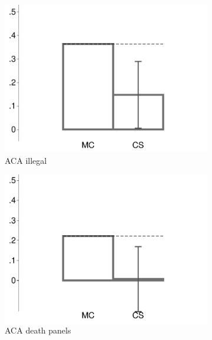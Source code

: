 \begin{figure}[t]
\begin{subfigure}{.325\textwidth}
		\includegraphics[width=\textwidth]{../figs/confidence_score_illegal_study1.pdf}
		\caption{ACA illegal}
	\end{subfigure}	
	\begin{subfigure}{.325\textwidth}\centering
		\includegraphics[width=\textwidth]{../figs/confidence_score_death_study1.pdf}
		\caption{ACA death panels}
	\end{subfigure}
	\hfill
	\begin{subfigure}{.325\textwidth}\centering

\end{subfigure}
\end{figure}
